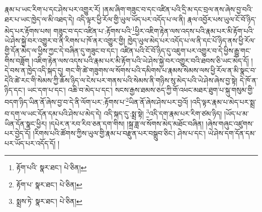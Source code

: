 རྣམ་པ་ཡང་རིག་པ་དང་ཤེས་པར་འགྱུར་རོ། །ནམ་ཞིག་གཟུང་བ་དང་འཛིན་པའི་དྲི་མ་དང་བྲལ་ནས་ཞེས་བྱ་བའི་ཐར་པ་ཡང་ཁྱེད་ལ་མི་འཐད་དེ། འདི་ལྟར་ཕྱི་རོལ་གྱི་ཡུལ་ཡོད་པར་འདོད་པ་ལ་ནི། རྣལ་འབྱོར་པས་ཡུལ་ངོ་བོ་ཉིད་མེད་པར་རྟོགས་པས། གཟུང་བ་དང་འཛིན་པ་:རྟོགས་པའི་\footnote{རྟོག་པའི་  སྣར་ཐང་།  པེ་ཅིན། }ཕྱིར་འཇིག་རྟེན་ལས་འདས་པའི་རྣམ་པར་མི་རྟོག་པའི་ཡེ་ཤེས་སྐྱེ་བར་འགྱུར་བ་ནི་རིགས་པ་ཁོ་ནར་འགྱུར་གྱི། ཁྱེད་ཡུལ་མེད་པར་འདོད་པ་ལ་ནི་དང་པོ་ཉིད་ནས་ཕྱི་རོལ་གྱི་དོན་མེད་ལ་ཕྱིས་ཀྱང་དེ་བཞིན་དུ་གཟུང་བ་དང་། འཛིན་པའི་ངོ་བོ་ཉིད་དུ་འཇུག་པར་འགྱུར་བ་དེ་ཕྱིས་རྒྱུ་གང་གིས་བཟློག །འཇིག་རྟེན་ལས་འདས་པའི་རྣམ་པར་མི་རྟོག་པའི་ཡེ་ཤེས་སྐྱེ་བར་འགྱུར་བའི་ཐབས་ཅི་ཡང་མེད་དོ། །དེ་བས་ན་ཁྱེད་འདི་སྐད་དུ། གང་གི་ཚེ་གཟུགས་ལ་སོགས་པའི་དམིགས་པ་རྣམས་སེམས་ལས་ཕྱི་རོལ་ན་མི་སྣང་བ་དེའི་ཚེ་རང་གི་སེམས་ཀྱི་ཆོས་ཉིད་ལ་ངེས་པར་གནས་པའི་སེམས་ནི་གཉིས་སུ་མེད་པའི་ཡེ་ཤེས་ཞེས་བྱ་སྟེ། དེ་ཁོ་ན་ཉིད་དང་། ཡང་དག་པ་དང་། འཆི་བ་མེད་པ་དང་། སངས་རྒྱས་ཐམས་ཅད་ཀྱི་གོ་འཕང་མཐར་ཐུག་པ་སྐུ་གསུམ་གྱི་བདག་ཉིད་ཡིན་ནོ་ཞེས་བྱ་བ་དེ་ནི་ལོག་པར་:རྟོགས་པ་\footnote{རྟོག་པ་  སྣར་ཐང་།  པེ་ཅིན། }ཡིན་ནོ་ཞེས་ཤེས་པར་བྱའོ། །འདི་ལྟར་རྣམ་པ་མེད་པར་སྨྲ་བ་དག་ལ་ཡང་དོན་དམ་པའི་ཤེས་པ་མེད་དེ། འདི་སྐད་དུ་:སྨྲ་སྟེ། \footnote{སྨྲས་ཏེ་  སྣར་ཐང་།  པེ་ཅིན། }འདི་དག་རྣམ་པར་རིག་ཙམ་ཉིད། །ཡོད་པ་མ་ཡིན་དོན་སྣང་ཕྱིར། །དཔེར་ན་རབ་རིབ་ཅན་དག་གིས། །སྐྲ་ཟླ་ལ་སོགས་མེད་མཐོང་བཞིན། །ཞེས་གཞུང་འཛུགས་པར་བྱེད་དོ། །རིགས་པའི་ཚོགས་ཀྱིས་ཡུལ་གྱི་རྣམ་པ་བརྫུན་པར་བསྒྲུབ་ཅིང་། ཤེས་པ་དང་། ཡེ་ཤེས་དག་དོན་དམ་པར་ཡོད་པར་འདོད་དོ། །
